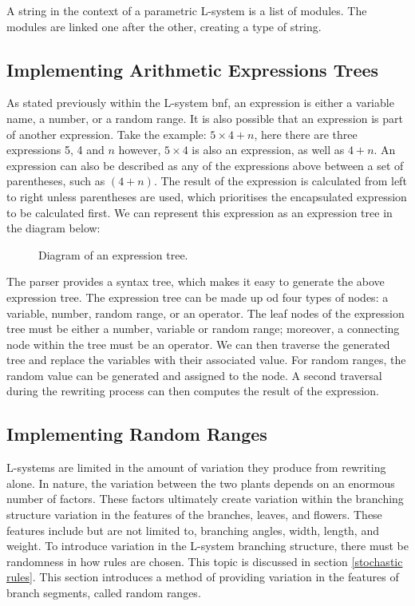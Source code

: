 A string in the context of a parametric L-system is a list of modules. The modules are linked one after the other, creating a type of string.

\subsection{Implementing Arithmetic Expressions Trees} \label{expression tree}

As stated previously within the L-system \acrshort{bnf}, an expression is either a variable name, a number, or a random range. It is also possible that an expression is part of another expression. Take the example: $5 \times 4 + n$, here there are three expressions 5, 4 and $n$ however, $5 \times 4$ is also an expression, as well as $4 + n$. An expression can also be described as any of the expressions above between a set of parentheses, such as $(4+n)$. The result of the expression is calculated from left to right unless parentheses are used, which prioritises the encapsulated expression to be calculated first. We can represent this expression as an expression tree in the diagram below:


\begin{figure}[htbp]
	{\centering
		\setlength{\fboxrule}{1pt}
		\vspace{7px}
		\caption{Diagram of an expression tree.} \label{3D rotations}
	}
\end{figure}
\FloatBarrier

\noindent
The parser provides a syntax tree, which makes it easy to generate the above expression tree. The expression tree can be made up od four types of nodes: a variable, number, random range, or an operator. The leaf nodes of the expression tree must be either a number, variable or random range; moreover, a connecting node within the tree must be an operator. We can then traverse the generated tree and replace the variables with their associated value. For random ranges, the random value can be generated and assigned to the node. A second traversal during the rewriting process can then computes the result of the expression.

\subsection{Implementing Random Ranges}

L-systems are limited in the amount of variation they produce from rewriting alone. In nature, the variation between the two plants depends on an enormous number of factors. These factors ultimately create variation within the branching structure variation in the features of the branches, leaves, and flowers. These features include but are not limited to, branching angles, width, length, and weight. To introduce variation in the L-system branching structure, there must be randomness in how rules are chosen. This topic is discussed in section \ref{stochastic rules}. This section introduces a method of providing variation in the features of branch segments, called random ranges.

